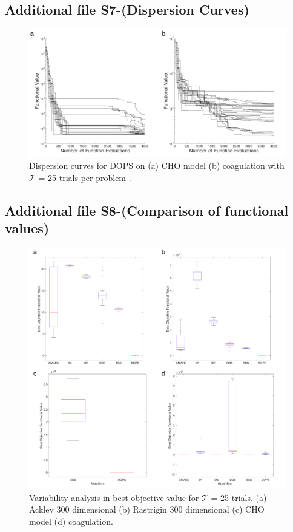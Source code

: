 \documentclass{bmcart}
\begin{document}
\begin{backmatter}
\subsection*{Additional file S7-(Dispersion Curves)}
\begin{figure}
\includegraphics[width=1.00\textwidth]{./rachelfigs/dispersion_curves-crop}
    \caption{Dispersion curves for DOPS on (a) CHO model (b) coagulation with $\mathcal{T}$ = 25 trials per problem .}%
    \label{fig-DOPS-Dispersion-Curves}%
\end{figure}

\clearpage

\subsection*{Additional file S8-(Comparison of functional values)}
\begin{figure}
\includegraphics[width=1.0\textwidth]{./rachelfigs/compare_functional_vals-crop}
    \caption{Variability analysis in best objective value for $\mathcal{T}$ = 25 trials. (a) Ackley  300 dimensional (b) Rastrigin 300 dimensional (c) CHO model (d) coagulation. }%
    \label{fig-DOPS-Variability}%
\end{figure}

\end{backmatter}
\end{document}
